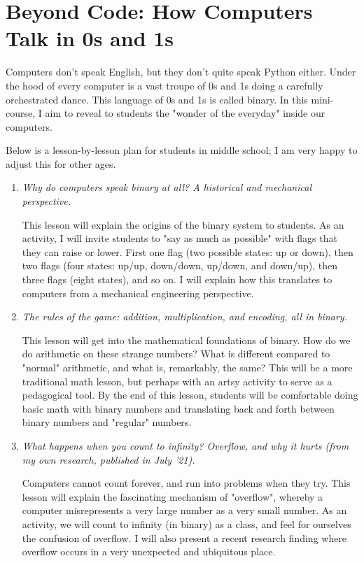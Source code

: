 \section{Beyond Code: How Computers Talk in 0s and 1s}
\label{appendix:pitch}

Computers don't speak English, but they don't quite speak Python either.
Under the hood of every computer is a vast troupe of 0s and 1s doing a carefully orchestrated dance.
This language of 0s and 1s is called binary.
In this mini-course, I aim to reveal to students the "wonder of the everyday" inside our computers.

Below is a lesson-by-lesson plan for students in middle school; I am very happy to adjust this for other ages.

\begin{enumerate}
  \item \emph{Why do computers speak binary at all? A historical and mechanical perspective.}

  This lesson will explain the origins of the binary system to students.
  As an activity, I will invite students to "say as much as possible" with flags that they can raise or lower.
  First one flag (two possible states: up or down), then two flags (four states: up/up, down/down, up/down, and down/up), then three flags (eight states), and so on.
  I will explain how this translates to computers from a mechanical engineering perspective.

  \item \emph{The rules of the game: addition, multiplication, and encoding, all in binary.}

  This lesson will get into the mathematical foundations of binary.
  How do we do arithmetic on these strange numbers?
  What is different compared to "normal" arithmetic, and what is, remarkably, the same?
  This will be a more traditional math lesson, but perhaps with an artsy activity to serve as a pedagogical tool.
  By the end of this lesson, students will be comfortable doing basic math with binary numbers and translating back and forth between binary numbers and "regular" numbers.

  \item \emph{What happens when you count to infinity? Overflow, and why it hurts (from my own research, published in July '21).}

  Computers cannot count forever, and run into problems when they try.
  This lesson will explain the fascinating mechanism of "overflow", whereby a computer misrepresents a very large number as a very small number.
  As an activity, we will count to infinity (in binary) as a class, and feel for ourselves the confusion of overflow.
  I will also present a recent research finding where overflow occurs in a very unexpected and ubiquitous place.


\end{enumerate}
